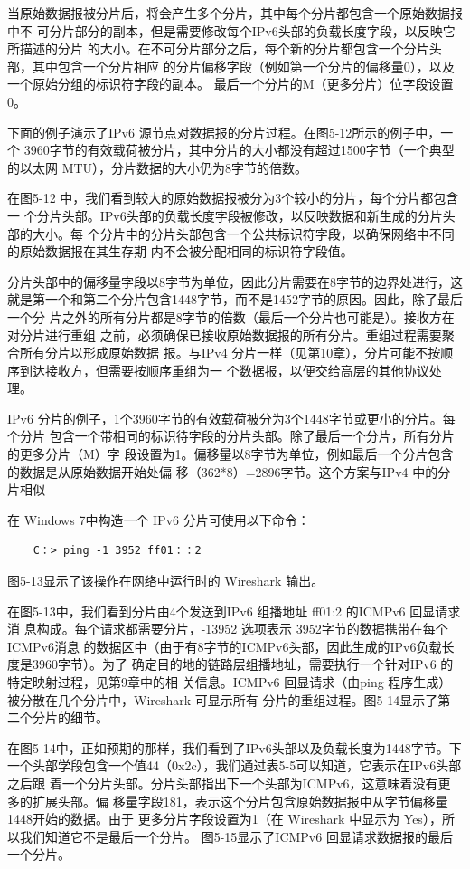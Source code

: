 当原始数据报被分片后，将会产生多个分片，其中每个分片都包含一个原始数据报中不
可分片部分的副本，但是需要修改每个IPv6头部的负载长度字段，以反映它所描述的分片
的大小。在不可分片部分之后，每个新的分片都包含一个分片头部，其中包含一个分片相应
的分片偏移字段（例如第一个分片的偏移量0），以及一个原始分组的标识符字段的副本。
最后一个分片的M（更多分片）位字段设置 0。

下面的例子演示了IPv6 源节点对数据报的分片过程。在图5-12所示的例子中，一个
3960字节的有效载荷被分片，其中分片的大小都没有超过1500字节（一个典型的以太网
MTU），分片数据的大小仍为8字节的倍数。

在图5-12 中，我们看到较大的原始数据报被分为3个较小的分片，每个分片都包含一
个分片头部。IPv6头部的负载长度字段被修改，以反映数据和新生成的分片头部的大小。每
个分片中的分片头部包含一个公共标识符字段，以确保网络中不同的原始数据报在其生存期
内不会被分配相同的标识符字段值。

分片头部中的偏移量字段以8字节为单位，因此分片需要在8字节的边界处进行，这
就是第一个和第二个分片包含1448字节，而不是1452字节的原因。因此，除了最后一个分
片之外的所有分片都是8字节的倍数（最后一个分片也可能是）。接收方在对分片进行重组
之前，必须确保已接收原始数据报的所有分片。重组过程需要聚合所有分片以形成原始数据
报。与IPv4 分片一样（见第10章），分片可能不按顺序到达接收方，但需要按顺序重组为一
个数据报，以便交给高层的其他协议处理。

IPv6 分片的例子，1个3960字节的有效载荷被分为3个1448字节或更小的分片。每个分片
包含一个带相同的标识待字段的分片头部。除了最后一个分片，所有分片的更多分片（M）字
段设置为1。偏移量以8字节为单位，例如最后一个分片包含的数据是从原始数据开始处偏
移（362*8）=2896字节。这个方案与IPv4 中的分片相似

在 Windows 7中构造一个 IPv6 分片可使用以下命令：

\begin{verbatim}
    C：> ping -1 3952 ff01：：2
\end{verbatim}

图5-13显示了该操作在网络中运行时的 Wireshark 输出。

在图5-13中，我们看到分片由4个发送到IPv6 组播地址 ff01:2 的ICMPv6 回显请求消
息构成。每个请求都需要分片，-13952 选项表示 3952字节的数据携带在每个ICMPv6消息
的数据区中（由于有8字节的ICMPv6头部，因此生成的IPv6负载长度是3960字节）。为了
确定目的地的链路层组播地址，需要执行一个针对IPv6 的特定映射过程，见第9章中的相
关信息。ICMPv6 回显请求（由ping 程序生成）被分散在几个分片中，Wireshark 可显示所有
分片的重组过程。图5-14显示了第二个分片的细节。

在图5-14中，正如预期的那样，我们看到了IPv6头部以及负载长度为1448字节。下
一个头部学段包含一个值44（0x2c），我们通过表5-5可以知道，它表示在IPv6头部之后跟
着一个分片头部。分片头部指出下一个头部为ICMPv6，这意味着没有更多的扩展头部。偏
移量字段181，表示这个分片包含原始数据报中从字节偏移量1448开始的数据。由于
更多分片字段设置为1（在 Wireshark 中显示为 Yes），所以我们知道它不是最后一个分片。
图5-15显示了ICMPv6 回显请求数据报的最后一个分片。

